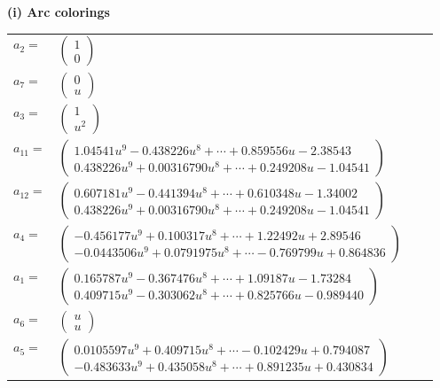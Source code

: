 \documentclass[1p]{elsarticle_modified}
\theoremstyle{definition}
\begin{document}
\flushleft \textbf{(i) Arc colorings}\\
\begin{tabular}{m{7pt} m{180pt} m{7pt} m{180pt} }
\flushright $a_{2}=$&$\begin{pmatrix}1\\0\end{pmatrix}$ \\
\flushright $a_{7}=$&$\begin{pmatrix}0\\u\end{pmatrix}$ \\
\flushright $a_{3}=$&$\begin{pmatrix}1\\u^2\end{pmatrix}$ \\
\flushright $a_{11}=$&$\begin{pmatrix}1.04541 u^{9}-0.438226 u^{8}+\cdots+0.859556 u-2.38543\\0.438226 u^{9}+0.00316790 u^{8}+\cdots+0.249208 u-1.04541\end{pmatrix}$ \\
\flushright $a_{12}=$&$\begin{pmatrix}0.607181 u^{9}-0.441394 u^{8}+\cdots+0.610348 u-1.34002\\0.438226 u^{9}+0.00316790 u^{8}+\cdots+0.249208 u-1.04541\end{pmatrix}$ \\
\flushright $a_{4}=$&$\begin{pmatrix}-0.456177 u^{9}+0.100317 u^{8}+\cdots+1.22492 u+2.89546\\-0.0443506 u^{9}+0.0791975 u^{8}+\cdots-0.769799 u+0.864836\end{pmatrix}$ \\
\flushright $a_{1}=$&$\begin{pmatrix}0.165787 u^{9}-0.367476 u^{8}+\cdots+1.09187 u-1.73284\\0.409715 u^{9}-0.303062 u^{8}+\cdots+0.825766 u-0.989440\end{pmatrix}$ \\
\flushright $a_{6}=$&$\begin{pmatrix}u\\u\end{pmatrix}$ \\
\flushright $a_{5}=$&$\begin{pmatrix}0.0105597 u^{9}+0.409715 u^{8}+\cdots-0.102429 u+0.794087\\-0.483633 u^{9}+0.435058 u^{8}+\cdots+0.891235 u+0.430834\end{pmatrix}$ \\

\end{tabular}
\end{document}
